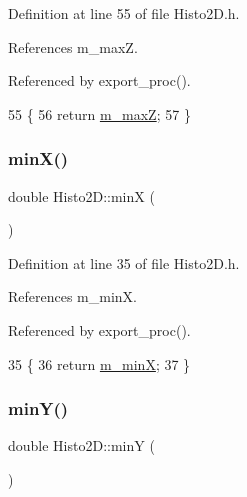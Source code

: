 Definition at line 55 of file Histo2\+D.\+h.



References m\+\_\+maxZ.



Referenced by export\+\_\+proc().


\begin{DoxyCode}
55                \{
56     \textcolor{keywordflow}{return} \hyperlink{classHisto2D_a82422535a6aeaf911129c91e0e44e603}{m\_maxZ};
57   \}
\end{DoxyCode}
\mbox{\label{classHisto2D_ae5a3ff63669999c9fda448db61e5bb57}} 
\subsubsection{\texorpdfstring{min\+X()}{minX()}}
{\footnotesize\ttfamily double Histo2\+D\+::minX (\begin{DoxyParamCaption}{ }\end{DoxyParamCaption})\hspace{0.3cm}{\ttfamily [inline]}}



Definition at line 35 of file Histo2\+D.\+h.



References m\+\_\+minX.



Referenced by export\+\_\+proc().


\begin{DoxyCode}
35                \{
36     \textcolor{keywordflow}{return} \hyperlink{classHisto2D_a039d7f45ec8b5b84c1d71f8f87884211}{m\_minX};
37   \}
\end{DoxyCode}
\mbox{\label{classHisto2D_ae946ecc8e7b4efc2e1454cd75c7d8aca}} 
\subsubsection{\texorpdfstring{min\+Y()}{minY()}}
{\footnotesize\ttfamily double Histo2\+D\+::minY (\begin{DoxyParamCaption}{ }\end{DoxyParamCaption})\hspace{0.3cm}{\ttfamily [inline]}}



